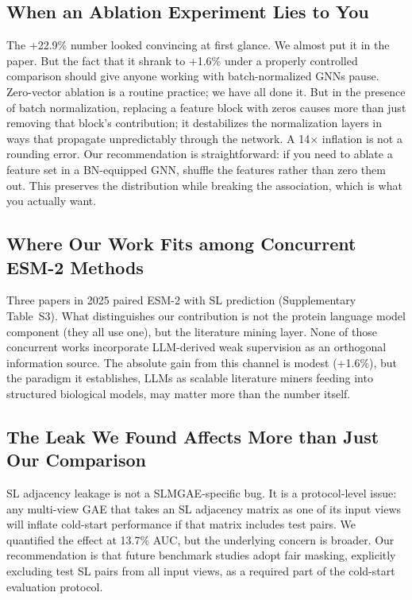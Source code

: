 \documentclass[12pt,a4paper]{article}
\begin{document}
\subsection{When an Ablation Experiment Lies to You}

The +22.9\% number looked convincing at first glance. We almost put it in the paper. But the fact that it shrank to +1.6\% under a properly controlled comparison should give anyone working with batch-normalized GNNs pause. Zero-vector ablation is a routine practice; we have all done it. But in the presence of batch normalization, replacing a feature block with zeros causes more than just removing that block's contribution; it destabilizes the normalization layers in ways that propagate unpredictably through the network. A 14$\times$ inflation is not a rounding error. Our recommendation is straightforward: if you need to ablate a feature set in a BN-equipped GNN, shuffle the features rather than zero them out. This preserves the distribution while breaking the association, which is what you actually want.

\subsection{Where Our Work Fits among Concurrent ESM-2 Methods}

Three papers in 2025 paired ESM-2 with SL prediction (Supplementary Table~S3). What distinguishes our contribution is not the protein language model component (they all use one), but the literature mining layer. None of those concurrent works incorporate LLM-derived weak supervision as an orthogonal information source. The absolute gain from this channel is modest (+1.6\%), but the paradigm it establishes, LLMs as scalable literature miners feeding into structured biological models, may matter more than the number itself.

\subsection{The Leak We Found Affects More than Just Our Comparison}

SL adjacency leakage is not a SLMGAE-specific bug. It is a protocol-level issue: any multi-view GAE that takes an SL adjacency matrix as one of its input views will inflate cold-start performance if that matrix includes test pairs. We quantified the effect at 13.7\% AUC, but the underlying concern is broader. Our recommendation is that future benchmark studies adopt fair masking, explicitly excluding test SL pairs from all input views, as a required part of the cold-start evaluation protocol.
\end{document}

